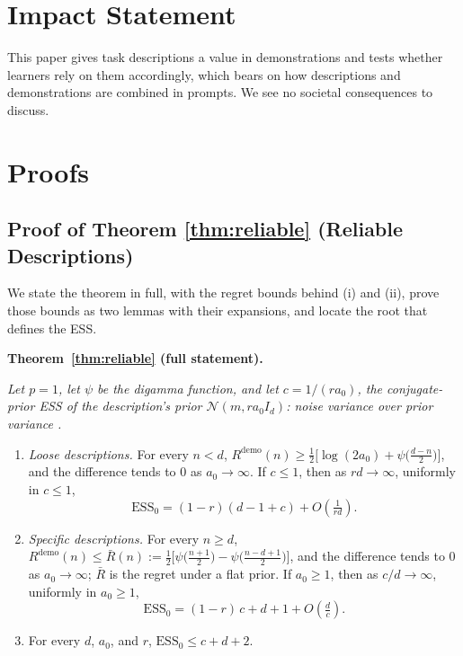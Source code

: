 \documentclass{article}
\newcommand{\ess}{\mathrm{ESS}}
\begin{document}
\section*{Impact Statement}
This paper gives task descriptions a value in demonstrations and tests whether learners rely on them accordingly, which bears on how descriptions and demonstrations are combined in prompts. We see no societal consequences to discuss.




\clearpage
\onecolumn
\appendix
\section{Proofs}

\subsection{Proof of Theorem \ref{thm:reliable} (Reliable Descriptions)}\label{app:specificity}
We state the theorem in full, with the regret bounds behind (i) and (ii), prove those bounds as two lemmas with their expansions, and locate the root that defines the ESS.

\medskip\noindent\textbf{Theorem~\ref{thm:reliable} (full statement).} {\itshape Let $p = 1$, let $\psi$ be the digamma function, and let $c = 1/(r a_0)$, the conjugate-prior ESS of the description's prior $\mathcal{N}(m, r a_0 I_d)$: noise variance over prior variance \citep{neuenschwander2020}.
\begin{enumerate}
\item[(i)] \emph{Loose descriptions.} For every $n < d$,
$R^{\mathrm{demo}}(n) \ge \tfrac12\big[\log(2a_0) + \psi\big(\tfrac{d-n}{2}\big)\big]$, and the difference tends to $0$ as $a_0 \to \infty$. If $c \le 1$, then as $rd \to \infty$, uniformly in $c \le 1$,
\[
\ess_0 = (1-r)(d-1+c) + O\!\left(\tfrac{1}{rd}\right).
\]
\item[(ii)] \emph{Specific descriptions.} For every $n \ge d$,
$R^{\mathrm{demo}}(n) \le \bar R(n) := \tfrac12\big[\psi\big(\tfrac{n+1}{2}\big) - \psi\big(\tfrac{n-d+1}{2}\big)\big]$, and the difference tends to $0$ as $a_0 \to \infty$; $\bar R$ is the regret under a flat prior. If $a_0 \ge 1$, then as $c/d \to \infty$, uniformly in $a_0 \ge 1$,
\[
\ess_0 = (1-r)\,c + d + 1 + O\!\left(\tfrac{d}{c}\right).
\]
\item[(iii)] For every $d$, $a_0$, and $r$, $\ess_0 \le c + d + 2$.
\end{enumerate}}
\medskip
\end{document}
